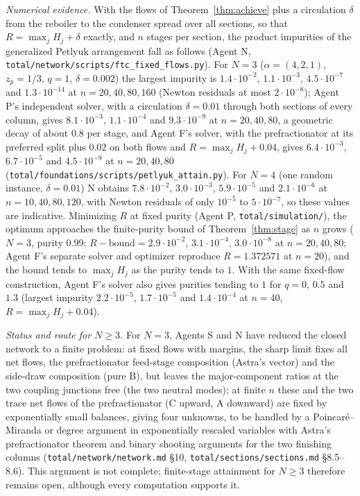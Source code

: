 \emph{Numerical evidence.} With the flows of Theorem~\ref{thm:achieve} plus a circulation $\delta$ from the reboiler to the
condenser spread over all sections, so that $R=\max_jH_j+\delta$ exactly, and $n$ stages per section, the product
impurities of the generalized Petlyuk arrangement fall as follows (Agent N, \texttt{total/network/scripts/ftc\_fixed\_flows.py}).
For $N=3$ ($\alpha=(4,2,1)$, $z_p=1/3$, $q=1$, $\delta=0.002$) the largest impurity is $1.4\cdot10^{-2}$, $1.1\cdot10^{-3}$,
$4.5\cdot10^{-7}$ and $1.3\cdot10^{-14}$ at $n=20,40,80,160$ (Newton residuals at most $2\cdot10^{-8}$); Agent P's independent
solver, with a circulation $\delta=0.01$ through both sections of every column, gives $8.1\cdot10^{-3}$, $1.1\cdot10^{-4}$ and
$9.3\cdot10^{-9}$ at $n=20,40,80$, a geometric decay of about $0.8$ per stage, and Agent F's solver, with the
prefractionator at its preferred split plus $0.02$ on both flows and $R=\max_jH_j+0.04$, gives $6.4\cdot10^{-3}$,
$6.7\cdot10^{-5}$ and $4.5\cdot10^{-9}$ at $n=20,40,80$ (\texttt{total/foundations/scripts/petlyuk\_attain.py}). For $N=4$ (one random instance,
$\delta=0.01$) N obtains $7.8\cdot10^{-2}$, $3.0\cdot10^{-3}$, $5.9\cdot10^{-5}$ and $2.1\cdot10^{-6}$ at $n=10,40,80,120$, with
Newton residuals of only $10^{-5}$ to $5\cdot10^{-7}$, so these values are indicative. Minimizing $R$ at fixed purity
(Agent P, \texttt{total/simulation/}), the optimum approaches the finite-purity bound of Theorem~\ref{thm:stage} as $n$
grows ($N=3$, purity $0.99$: $R-\text{bound}=2.9\cdot10^{-2}$, $3.1\cdot10^{-4}$, $3.0\cdot10^{-8}$ at $n=20,40,80$; Agent F's
separate solver and optimizer reproduce $R=1.372571$ at $n=20$), and the bound tends to $\max_jH_j$ as the purity tends
to $1$. With the same fixed-flow construction, Agent F's solver also gives purities tending to $1$ for $q=0$, $0.5$ and $1.3$
(largest impurity $2.2\cdot10^{-5}$, $1.7\cdot10^{-5}$ and $1.4\cdot10^{-4}$ at $n=40$, $R=\max_jH_j+0.04$).

\emph{Status and route for $N\ge3$.} For $N=3$, Agents S and N have reduced the closed network to a finite problem: at
fixed flows with margins, the sharp limit fixes all net flows, the prefractionator feed-stage composition (Astra's
vector) and the side-draw composition (pure B), but leaves the major-component ratios at the two coupling junctions
free (the two neutral modes); at finite $n$ these and the two trace net flows of the prefractionator (C upward, A
downward) are fixed by exponentially small balances, giving four unknowns, to be handled by a Poincar\'e--Miranda or
degree argument in exponentially rescaled variables with Astra's prefractionator theorem and binary shooting
arguments for the two finishing columns (\texttt{total/network/network.md} \S10, \texttt{total/sections/sections.md}
\S8.5--8.6). This argument is not complete; finite-stage attainment for $N\ge3$ therefore remains open, although every
computation supports it.
